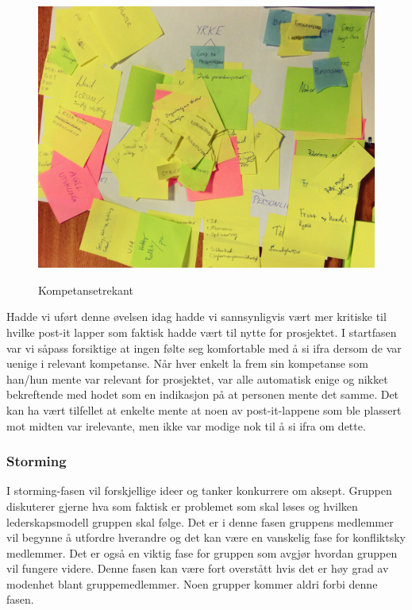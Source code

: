 \documentclass[a4paper,norsk,oneside]{article}
\begin{document}
\begin{figure}[H]
\centering
\includegraphics[scale=0.10]{figs/kompetansetrekant}
\label{kompetansetrekant}
\caption{Kompetansetrekant}
\end{figure}



Hadde vi uført denne øvelsen idag hadde vi sannsynligvis vært mer kritiske til hvilke post-it lapper som faktisk hadde vært til nytte for prosjektet. I startfasen var vi såpass forsiktige at ingen følte seg komfortable med å si ifra dersom de var uenige i relevant kompetanse. Når hver enkelt la frem sin kompetanse som han/hun mente var relevant for prosjektet, var alle automatisk enige og nikket bekreftende med hodet som en indikasjon på at personen mente det samme. Det kan ha vært tilfellet at enkelte mente at noen av post-it-lappene som ble plassert mot midten var irelevante, men ikke var modige nok til å si ifra om dette.  

\subsubsection{Storming}
I storming-fasen vil forskjellige ideer og tanker konkurrere om aksept. Gruppen diskuterer gjerne hva som faktisk er problemet som skal løses og hvilken lederskapsmodell gruppen skal følge. Det er i denne fasen gruppens medlemmer vil begynne å utfordre hverandre og det kan være en vanskelig fase for konfliktsky medlemmer. Det er også en viktig fase for gruppen som avgjør hvordan gruppen vil fungere videre. Denne fasen kan være fort overstått hvis det er høy grad av modenhet blant gruppemedlemmer. Noen grupper kommer aldri forbi denne fasen.
\end{document}
